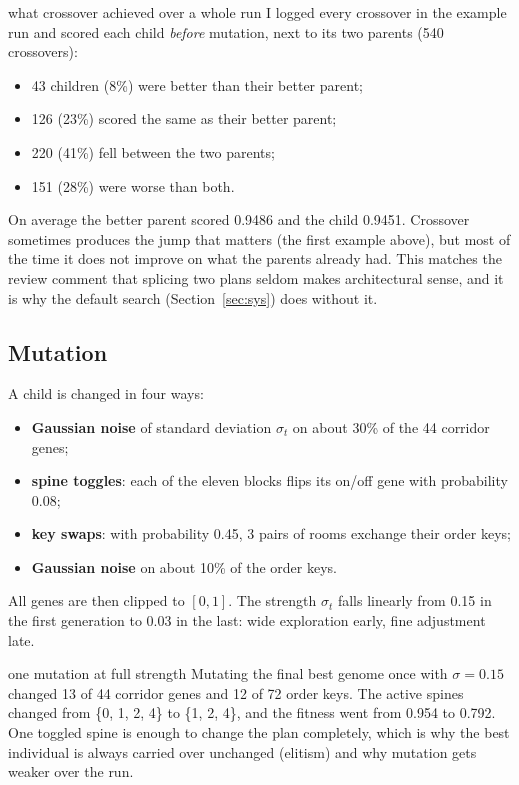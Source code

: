 \documentclass[10pt,a4paper]{article}
\begin{document}
\begin{example}{what crossover achieved over a whole run}
I logged every crossover in the example run and scored each child \emph{before} mutation, next to its two parents
(540 crossovers):
\begin{itemize}
\item 43 children (8\%) were better than their better parent;
\item 126 (23\%) scored the same as their better parent;
\item 220 (41\%) fell between the two parents;
\item 151 (28\%) were worse than both.
\end{itemize}
On average the better parent scored 0.9486 and the child 0.9451. Crossover sometimes produces the jump that matters
(the first example above), but most of the time it does not improve on what the parents already had. This matches
the review comment that splicing two plans seldom makes architectural sense, and it is why the default search
(Section~\ref{sec:sys}) does without it.
\end{example}

\subsection{Mutation}
A child is changed in four ways:
\begin{itemize}
\item \textbf{Gaussian noise} of standard deviation $\sigma_t$ on about 30\% of the 44 corridor genes;
\item \textbf{spine toggles}: each of the eleven blocks flips its on/off gene with probability 0.08;
\item \textbf{key swaps}: with probability 0.45, 3 pairs of rooms exchange their order keys;
\item \textbf{Gaussian noise} on about 10\% of the order keys.
\end{itemize}
All genes are then clipped to $[0, 1]$. The strength $\sigma_t$ falls linearly from 0.15 in the first generation to
0.03 in the last: wide exploration early, fine adjustment late.

\begin{example}{one mutation at full strength}
Mutating the final best genome once with $\sigma = 0.15$ changed 13 of 44 corridor genes and
12 of 72 order keys. The active spines changed from \{0, 1, 2, 4\} to \{1, 2, 4\}, and the fitness went from 0.954 to
0.792. One toggled spine is enough to change the plan completely, which is why the best individual is always carried
over unchanged (elitism) and why mutation gets weaker over the run.
\end{example}
\end{document}
